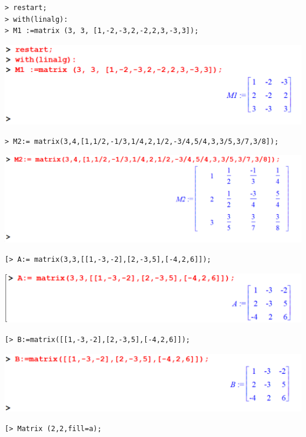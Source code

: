 \documentclass[
]{book}
\theoremstyle{definition}
\theoremstyle{definition}
\theoremstyle{definition}
\theoremstyle{definition}
\theoremstyle{remark}
\begin{document}
\begin{verbatim}
> restart;
> with(linalg):
> M1 :=matrix (3, 3, [1,-2,-3,2,-2,2,3,-3,3]);
\end{verbatim}

\includegraphics{figures/Lesson 4/fig1.png}

\begin{verbatim}
> M2:= matrix(3,4,[1,1/2,-1/3,1/4,2,1/2,-3/4,5/4,3,3/5,3/7,3/8]);
\end{verbatim}

\includegraphics{figures/Lesson 4/fig2.png}

\begin{verbatim}
[> A:= matrix(3,3,[[1,-3,-2],[2,-3,5],[-4,2,6]]);
\end{verbatim}

\includegraphics{figures/Lesson 4/fig3.png}

\begin{verbatim}
[> B:=matrix([[1,-3,-2],[2,-3,5],[-4,2,6]]);
\end{verbatim}

\includegraphics{figures/Lesson 4/fig4.png}

\begin{verbatim}
[> Matrix (2,2,fill=a);
\end{verbatim}
\end{document}
